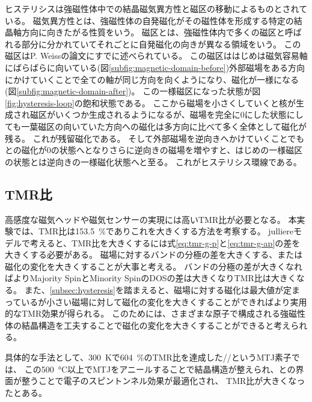 \documentclass[../../../main]{subfiles}
\begin{document}
ヒステリシスは強磁性体中での結晶磁気異方性と磁区の移動によるものとされている。
磁気異方性とは、強磁性体の自発磁化がその磁性体を形成する特定の結晶軸方向に向きたがる性質\cite{ferromagnetic-2}をいう。
磁区とは、強磁性体内で多くの磁区と呼ばれる部分に分かれていてそれごとに自発磁化の向きが異なる領域をいう。
この磁区はP. Weiss\cite{magnetic-domain}の論文にすでに述べられている。
この磁区ははじめは磁気容易軸にばらばらに向いている(図\ref{subfig:magnetic-domain-before})外部磁場をある方向にかけていくことで全ての軸が同じ方向を向くようになり、磁化が一様になる(図\ref{subfig:magnetic-domain-after})。
この一様磁区になった状態が図\ref{fig:hysteresis-loop}の飽和状態である。
ここから磁場を小さくしていくと核が生成され磁区がいくつか生成されるようになるが、磁場を完全に0にした状態にしても一葉磁区の向いていた方向への磁化は多方向に比べて多く全体として磁化が残る。
これが残留磁化である。
そして外部磁場を逆向きへかけていくことでもとの磁化が0の状態へとなりさらに逆向きの磁場を増やすと、はじめの一様磁区の状態とは逆向きの一様磁化状態へと至る。
これがヒステリシス環線である。



\subsection{TMR比}
高感度な磁気ヘッドや磁気センサーの実現には高いTMR比が必要となる。
本実験では、TMR比は\SI{153.5}{\%}でありこれを大きくする方法を考察する。
julliereモデルで考えると、TMR比を大きくするには式\ref{eq:tmr-g-p}と\ref{eq:tmr-g-ap}の差を大きくする必要がある。
磁場に対するバンドの分極の差を大きくする、または磁化の変化を大きくすることが大事と考える。
バンドの分極の差が大きくなればよりMajority SpinとMinority SpinのDOSの差は大きくなりTMR比は大きくなる。
また、\ref{subsec:hysteresis}を踏まえると、磁場に対する磁化は最大値が定まっているが小さい磁場に対して磁化の変化を大きくすることができればより実用的なTMR効果が得られる。
このためには、さまざまな原子で構成される強磁性体の結晶構造を工夫することで磁化の変化を大きくすることができると考えられる。

具体的な手法として、\SI{300}{K}で\SI{604}{\%}のTMR比を達成した//というMTJ素子\cite{cofeb-mgo-tmr}では、
この\SI{500}{\celsius}以上でMTJをアニールすることで結晶構造が整えられ、との界面が整うことで電子のスピントンネル効果が最適化され、
TMR比が大きくなったとある。
\end{document}
